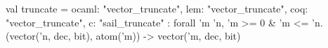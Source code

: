 val truncate = {
  ocaml: "vector_truncate",
  lem: "vector_truncate",
  coq: "vector_truncate",
  c: "sail_truncate"
} : forall 'm 'n, 'm >= 0 & 'm <= 'n. (vector('n, dec, bit), atom('m)) -> vector('m, dec, bit)
